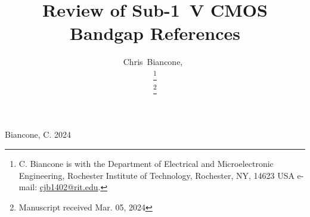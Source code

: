 \documentclass[journal]{IEEEtran}
\begin{document}
%
\title{Review of Sub-\qty{1}{\V} CMOS Bandgap References}
%
%
%

\author{Chris~Biancone,~
        
\thanks{C. Biancone is with the Department
of Electrical and Microelectronic Engineering, Rochester Institute of Technology, Rochester,
NY, 14623 USA e-mail: \href{mailto:cjb1402@rit.edu}{cjb1402@rit.edu}.}%

\thanks{Manuscript received Mar. 05, 2024}
}

% 
%



%
{Biancone, C. 2024}
% 
\end{document}
